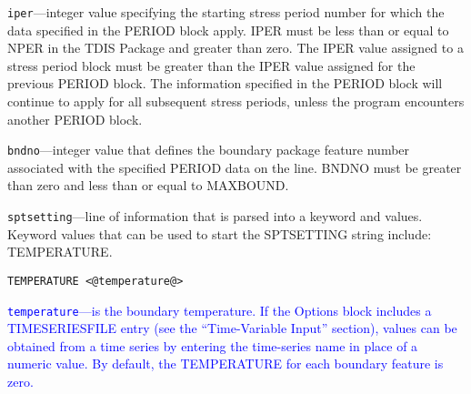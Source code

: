 \begin{description}
\item \texttt{iper}---integer value specifying the starting stress period number for which the data specified in the PERIOD block apply.  IPER must be less than or equal to NPER in the TDIS Package and greater than zero.  The IPER value assigned to a stress period block must be greater than the IPER value assigned for the previous PERIOD block.  The information specified in the PERIOD block will continue to apply for all subsequent stress periods, unless the program encounters another PERIOD block.

\item \texttt{bndno}---integer value that defines the boundary package feature number associated with the specified PERIOD data on the line. BNDNO must be greater than zero and less than or equal to MAXBOUND.

\item \texttt{sptsetting}---line of information that is parsed into a keyword and values.  Keyword values that can be used to start the SPTSETTING string include: TEMPERATURE.

\begin{lstlisting}[style=blockdefinition]
TEMPERATURE <@temperature@>
\end{lstlisting}

\item \textcolor{blue}{\texttt{temperature}---is the boundary temperature. If the Options block includes a TIMESERIESFILE entry (see the ``Time-Variable Input'' section), values can be obtained from a time series by entering the time-series name in place of a numeric value. By default, the TEMPERATURE for each boundary feature is zero.}

\end{description}

